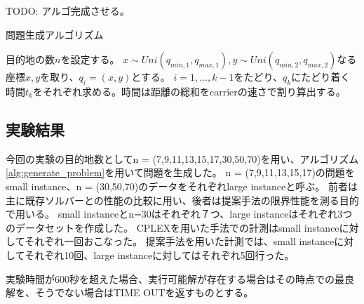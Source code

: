 \documentclass[11pt,a4paper,dvipdfmx,titlepage,uplatex]{jsarticle}
\theoremstyle{mystyle}
\newcommand{\0}{\mathbf{0}}
\begin{document}
	TODO: アルゴ完成させる。
	\begin{algorithm}[tb]
		\caption{問題生成アルゴリズム}
		\label{alg:generate_problem}
		\begin{algorithmic}[1]
			\STATE 目的地の数$n$を設定する。
			\STATE $x \sim Uni(q_{min,1}, q_{max,1}),y\sim Uni(q_{min,2}, q_{max,2})$なる座標$x,y$を取り、$q_i = (x,y)$とする。
			\ENDFOR
			\STATE $i = 1,\dots, k-1$をたどり、$q_k$にたどり着く時間$t_k$をそれぞれ求める。時間は距離の総和をcarrierの速さで割り算出する。
			\STATE 
		\end{algorithmic}
	\end{algorithm}
	
	\subsection{実験結果}\label{sec:Numerical_Result}
	今回の実験の目的地数としてn = (7,9,11,13,15,17,30,50,70)を用い、アルゴリズム\ref{alg:generate_problem}を用いて問題を生成した。
	n = (7,9,11,13,15,17)の問題をsmall instance、n = (30,50,70)のデータをそれぞれlarge instanceと呼ぶ。
	前者は主に既存ソルバーとの性能の比較に用い、後者は提案手法の限界性能を測る目的で用いる。
	small instanceとn=30はそれぞれ７つ、large instanceはそれぞれ3つのデータセットを作成した。
	CPLEXを用いた手法での計測はsmall instanceに対してそれぞれ一回おこなった。
	提案手法を用いた計測では、small instanceに対してそれぞれ10回、large instanceに対してはそれぞれ5回行った。
	
	実験時間が600秒を超えた場合、実行可能解が存在する場合はその時点での最良解を、そうでない場合はTIME OUTを返すものとする。
	
\end{document}
